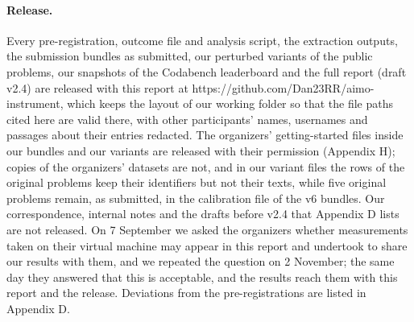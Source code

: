 \paragraph{Release.} Every pre-registration, outcome file and analysis script, the extraction outputs, the submission bundles as submitted, our perturbed variants of the public problems, our snapshots of the Codabench leaderboard and the full report (draft v2.4) are released with this report at https://github.com/Dan23RR/aimo-instrument, which keeps the layout of our working folder so that the file paths cited here are valid there, with other participants' names, usernames and passages about their entries redacted. The organizers' getting-started files inside our bundles and our variants are released with their permission (Appendix H); copies of the organizers' datasets are not, and in our variant files the rows of the original problems keep their identifiers but not their texts, while five original problems remain, as submitted, in the calibration file of the v6 bundles. Our correspondence, internal notes and the drafts before v2.4 that Appendix D lists are not released. On 7 September we asked the organizers whether measurements taken on their virtual machine may appear in this report and undertook to share our results with them, and we repeated the question on 2 November; the same day they answered that this is acceptable, and the results reach them with this report and the release. Deviations from the pre-registrations are listed in Appendix D.
